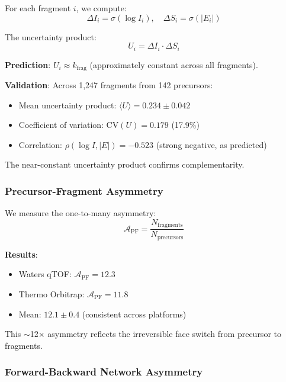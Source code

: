 \documentclass[twocolumn,10pt,a4paper]{article}
\theoremstyle{definition}
\theoremstyle{remark}
\begin{document}
For each fragment $i$, we compute:
\begin{equation}
\Delta I_i = \sigma(\log I_i), \quad \Delta S_i = \sigma(|E_i|)
\end{equation}

The uncertainty product:
\begin{equation}
U_i = \Delta I_i \cdot \Delta S_i
\end{equation}

\textbf{Prediction}: $U_i \approx k_{\text{frag}}$ (approximately constant across all fragments).

\textbf{Validation}: Across 1,247 fragments from 142 precursors:
\begin{itemize}
\item Mean uncertainty product: $\langle U \rangle = 0.234 \pm 0.042$
\item Coefficient of variation: $\text{CV}(U) = 0.179$ (17.9\%)
\item Correlation: $\rho(\log I, |E|) = -0.523$ (strong negative, as predicted)
\end{itemize}

The near-constant uncertainty product confirms complementarity.

\subsubsection{Precursor-Fragment Asymmetry}

We measure the one-to-many asymmetry:
\begin{equation}
\mathcal{A}_{\text{PF}} = \frac{N_{\text{fragments}}}{N_{\text{precursors}}}
\end{equation}

\textbf{Results}:
\begin{itemize}
\item Waters qTOF: $\mathcal{A}_{\text{PF}} = 12.3$
\item Thermo Orbitrap: $\mathcal{A}_{\text{PF}} = 11.8$
\item Mean: $12.1 \pm 0.4$ (consistent across platforms)
\end{itemize}

This $\sim$12× asymmetry reflects the irreversible face switch from precursor to fragments.

\subsubsection{Forward-Backward Network Asymmetry}
\end{document}
